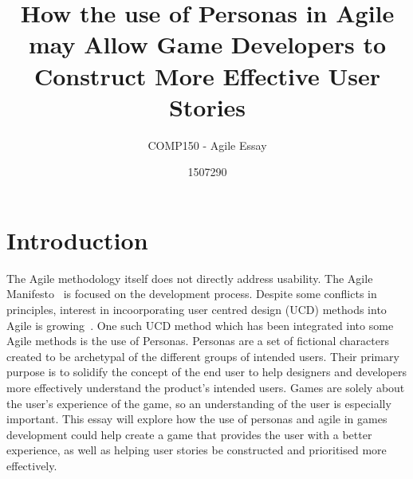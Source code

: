 \documentclass{scrartcl}
\title{How the use of Personas in Agile may Allow Game Developers to Construct More Effective User Stories}
\subtitle{COMP150 - Agile Essay}
\author{1507290}
\begin{document}
\maketitle


\section{Introduction}
The Agile methodology itself does not directly address usability. The Agile Manifesto~\cite{} is focused on the development process. Despite some conflicts in principles, interest in incoorporating user centred design (UCD) methods into Agile is growing~\cite{haikara:extending}. One such UCD method which has been integrated into some Agile methods is the use of Personas. Personas are a set of fictional characters created to be archetypal of the different groups of intended users. Their primary purpose is to solidify the concept of the end user to help designers and developers more effectively understand the product's intended users. 
Games are solely about the user's experience of the game, so an understanding of the user is especially important. This essay will explore how the use of personas and agile in games development could help create a game that provides the user with a better experience, as well as helping user stories be constructed and prioritised more effectively.

\end{document}
